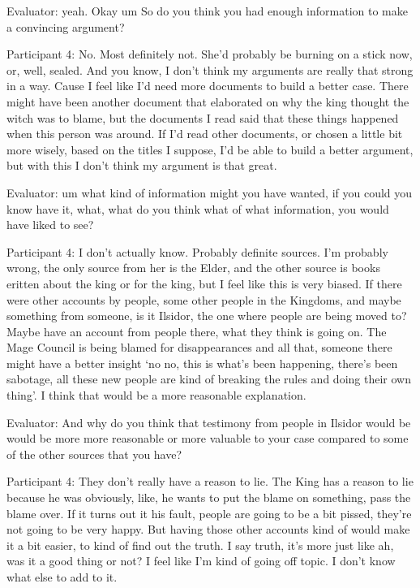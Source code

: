 \documentclass{l4proj}
\begin{document}
\begin{appendices}
Evaluator: yeah. Okay um So do you think you had enough information to make a convincing argument?

Participant 4: No. Most definitely not. She’d probably be burning on a stick now, or, well, sealed. And you know, I don’t think my arguments are really that strong in a way. Cause I feel like I’d need more documents to build a better case. There might have been another document that elaborated on why the king thought the witch was to blame, but the documents I read said that these things happened when this person was around. If I’d read other documents, or chosen a little bit more wisely, based on the titles I suppose, I’d be able to build a better argument, but with this I don’t think my argument is that great. 

Evaluator: um what kind of information might you have wanted, if you could you know have it, what, what do you think what of what information, you would have liked to see?

Participant 4: I don’t actually know. Probably definite sources. I’m probably wrong, the only source from her is the Elder, and the other source is books eritten about the king or for the king, but I feel like this is very biased. If there were other accounts by people, some other people in the Kingdoms, and maybe something from someone, is it Ilsidor, the one where people are being moved to? Maybe have an account from people there, what they think is going on. The Mage Council is being blamed for disappearances and all that, someone there might have a better insight ‘no no, this is what’s been happening, there’s been sabotage, all these new people are kind of breaking the rules and doing their own thing’. I think that would be a more reasonable explanation. 

Evaluator: And why do you think that testimony from people in Ilsidor would be would be more more reasonable or more valuable to your case compared to some of the other sources that you have?

Participant 4: They don’t really have a reason to lie. The King has a reason to lie because he was obviously, like, he wants to put the blame on something, pass the blame over. If it turns out it his fault, people are going to be a bit pissed, they’re not going to be very happy. But having those other accounts kind of would make it a bit easier, to kind of find out the truth. I say truth, it’s more just like ah, was it a good thing or not? I feel like I’m kind of going off topic. I don’t know what else to add to it. 


\end{appendices}
\end{document}
